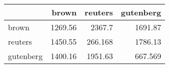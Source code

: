\begin{tabular}{lrrr}
\hline
           &   brown &   reuters &   gutenberg \\
\hline
 brown     & 1269.56 &  2367.7   &    1691.87  \\
 reuters   & 1450.55 &   266.168 &    1786.13  \\
 gutenberg & 1400.16 &  1951.63  &     667.569 \\
\hline
\end{tabular}